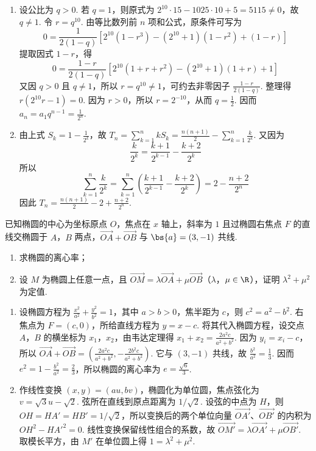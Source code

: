\begin{solution}
\begin{enumerate}
\item 设公比为 \(q>0\). 若 \(q=1\)，则原式为 \(2^{10}\cdot15-1025\cdot10+5=5115\ne0\)，故 \(q\ne1\). 令 \(r=q^{10}\). 由等比数列前 \(n\) 项和公式，原条件可写为
\[
0=\frac{1}{2(1-q)}\left[2^{10}(1-r^{3})-(2^{10}+1)(1-r^{2})+(1-r)\right]
\]
提取因式 \(1-r\)，得
\[
0=\frac{1-r}{2(1-q)}\left[2^{10}(1+r+r^{2})-(2^{10}+1)(1+r)+1\right]
\]
又因 \(q>0\) 且 \(q\ne1\)，所以 \(r=q^{10}\ne1\)，可约去非零因子 \(\frac{1-r}{2(1-q)}\). 整理得 \(r(2^{10}r-1)=0\). 因为 \(r>0\)，所以 \(r=2^{-10}\)，从而 \(q=\frac{1}{2}\). 因而 \(a_{n}=a_{1}q^{n-1}=\frac{1}{2^{n}}\).
\item 由上式 \(S_{k}=1-\frac{1}{2^{k}}\)，故
\(T_{n}=\sum_{k=1}^{n}kS_{k}=\frac{n(n+1)}{2}-\sum_{k=1}^{n}\frac{k}{2^{k}}\). 又因为
\[
\frac{k}{2^{k}}=\frac{k+1}{2^{k-1}}-\frac{k+2}{2^{k}}
\]
所以
\[
\sum_{k=1}^{n}\frac{k}{2^{k}}
=\sum_{k=1}^{n}\left(\frac{k+1}{2^{k-1}}-\frac{k+2}{2^{k}}\right)
=2-\frac{n+2}{2^{n}}
\]
因此 \(T_{n}=\frac{n(n+1)}{2}-2+\frac{n+2}{2^{n}}\).
\end{enumerate}
\end{solution}

\begin{problem}
已知椭圆的中心为坐标原点 \(O\)，焦点在 \(x\) 轴上，斜率为 \(1\) 且过椭圆右焦点 \(F\) 的直线交椭圆于 \(A\)，\(B\) 两点，\(\overrightarrow{OA}+\overrightarrow{OB}\) 与 \(\bs{a}=(3,-1)\) 共线.

\begin{enumerate}
\item 求椭圆的离心率；
\item 设 \(M\) 为椭圆上任意一点，且 \(\overrightarrow{OM}=\lambda\overrightarrow{OA}+\mu\overrightarrow{OB}\)（\(\lambda\)，\(\mu\in\R\)），证明 \(\lambda^{2}+\mu^{2}\) 为定值.
\end{enumerate}
\end{problem}

\begin{solution}
\begin{enumerate}
\item 设椭圆方程为 \(\frac{x^{2}}{a^{2}}+\frac{y^{2}}{b^{2}}=1\)，其中 \(a>b>0\)，焦半距为 \(c\)，则 \(c^{2}=a^{2}-b^{2}\).  右焦点为 \(F=(c,0)\)，所给直线方程为 \(y=x-c\). 将其代入椭圆方程，设交点 \(A\)，\(B\) 的横坐标为 \(x_{1}\)，\(x_{2}\)，由韦达定理得 \(x_{1}+x_{2}=\frac{2a^{2}c}{a^{2}+b^{2}}\). 因为 \(y_{i}=x_{i}-c\)，所以
\(\overrightarrow{OA}+\overrightarrow{OB}=\left(\frac{2a^{2}c}{a^{2}+b^{2}},-\frac{2b^{2}c}{a^{2}+b^{2}}\right)\). 它与 \((3,-1)\) 共线，故 \(\frac{b^{2}}{a^{2}}=\frac{1}{3}\). 因而 \(e^{2}=1-\frac{b^{2}}{a^{2}}=\frac{2}{3}\)，所以椭圆的离心率为 \(e=\frac{\sqrt{6}}{3}\).
\item 作线性变换 \((x,y)=(au,bv)\)，椭圆化为单位圆，焦点弦化为 \(v=\sqrt3u-\sqrt2\). 弦所在直线到原点距离为 \(1/\sqrt2\). 设弦的中点为 \(H\)，则 \(OH=HA'=HB'=1/\sqrt2\)，所以变换后的两个单位向量 \(\overrightarrow{OA'}\)、\(\overrightarrow{OB'}\) 的内积为 \(OH^2-HA'^2=0\). 线性变换保留线性组合的系数，故 \(\overrightarrow{OM'}=\lambda\overrightarrow{OA'}+\mu\overrightarrow{OB'}\). 取模长平方，由 \(M'\) 在单位圆上得 \(1=\lambda^2+\mu^2\).
\end{enumerate}
\end{solution}

